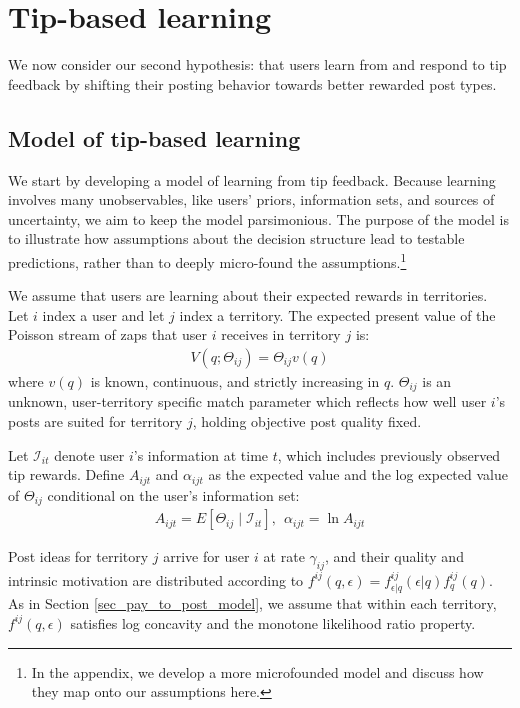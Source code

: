 \section{Tip-based learning}\label{sec_v4v}

We now consider our second hypothesis: that users learn from and respond to tip feedback by shifting their posting behavior towards better rewarded post types. 

\subsection{Model of tip-based learning}

We start by developing a model of learning from tip feedback. Because learning involves many unobservables, like users' priors, information sets, and sources of uncertainty, we aim to keep the model parsimonious. The purpose of the model is to illustrate how assumptions about the decision structure lead to testable predictions, rather than to deeply micro-found the assumptions.\footnote{In the appendix, we develop a more microfounded model and discuss how they map onto our assumptions here.}

We assume that users are learning about their expected rewards in territories. Let $i$ index a user and let $j$ index a territory. The expected present value of the Poisson stream of zaps that user $i$ receives in territory $j$ is:
\begin{align}
V(q; \Theta_{ij}) = \Theta_{ij} v(q)  \label{eq_v4v_V}
\end{align}
where $v(q)$ is known, continuous, and strictly increasing in $q$. $\Theta_{ij}$ is an unknown, user-territory specific match parameter which reflects how well user $i$'s posts are suited for territory $j$, holding objective post quality fixed.

Let $\mathcal{I}_{it}$ denote user $i$'s information at time $t$, which includes previously observed tip rewards. Define $A_{ijt}$ and $\alpha_{ijt}$ as the expected value and the log expected value of $\Theta_{ij}$ conditional on the user's information set:
\begin{align}
A_{ijt} = E\left[ \Theta_{ij} \mid \mathcal{I}_{it} \right], ~ ~ \alpha_{ijt} = \ln A_{ijt}
\end{align}

Post ideas for territory $j$ arrive for user $i$ at rate $\gamma_{ij}$, and their quality and intrinsic motivation are distributed according to $f^{ij}(q,\epsilon) = f^{ij}_{\epsilon|q}(\epsilon|q)f^{ij}_q(q)$. As in Section \ref{sec_pay_to_post_model}, we assume that within each territory, $f^{ij}(q,\epsilon)$ satisfies log concavity and the monotone likelihood ratio property.

